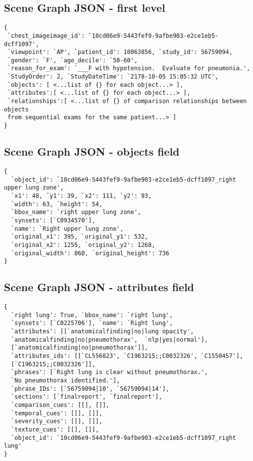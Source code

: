 \subsection{Scene Graph JSON - first level}\label{json1}
\begin{footnotesize}
\begin{verbatim}
{
 `chest_imageimage_id': `10cd06e9-5443fef9-9afbe903-e2ce1eb5-dcff1097',
 `viewpoint': `AP', `patient_id': 10063856, `study_id': 56759094,
 `gender': `F', `age_decile': `50-60',
 `reason_for_exam': `___F with hypotension.  Evaluate for pneumonia.',
 `StudyOrder': 2, `StudyDateTime': `2178-10-05 15:05:32 UTC',
 `objects': [ <...list of {} for each object...> ],
 `attributes':[ <...list of {} for each object...> ],
 `relationships':[ <...list of {} of comparison relationships between objects 
 from sequential exams for the same patient...> ] 
}
\end{verbatim}
\end{footnotesize}


\subsection{Scene Graph JSON - objects field}\label{json2}
\begin{footnotesize}
\begin{verbatim}
{
  `object_id': `10cd06e9-5443fef9-9afbe903-e2ce1eb5-dcff1097_right upper lung zone',
  `x1': 48, `y1': 39, `x2': 111, `y2': 93,
  `width': 63, `height': 54,
  `bbox_name': `right upper lung zone',
  `synsets': [`C0934570'],
  `name': `Right upper lung zone',
  `original_x1': 395, `original_y1': 532,
  `original_x2': 1255, `original_y2': 1268,
  `original_width': 860, `original_height': 736
}
\end{verbatim}
\end{footnotesize}


\subsection{Scene Graph JSON - attributes field}\label{json3}
\begin{footnotesize}
\begin{verbatim}
{
  `right lung': True, `bbox_name': `right lung',
  `synsets': [`C0225706'], `name': `Right lung',
  `attributes': [[`anatomicalfinding|no|lung opacity',
  `anatomicalfinding|no|pneumothorax',  `nlp|yes|normal'],
  [`anatomicalfinding|no|pneumothorax']],
  `attributes_ids': [[`CL556823', `C1963215;;C0032326', `C1550457'],
  [`C1963215;;C0032326']],
  `phrases': [`Right lung is clear without pneumothorax.', 
  `No pneumothorax identified.'],
  `phrase_IDs': [`56759094|10', `56759094|14'],
  `sections': [`finalreport', `finalreport'],
  `comparison_cues': [[], []],
  `temporal_cues': [[], []],
  `severity_cues': [[], []],
  `texture_cues': [[], []],
  `object_id': `10cd06e9-5443fef9-9afbe903-e2ce1eb5-dcff1097_right lung'
}
\end{verbatim}
\end{footnotesize}



